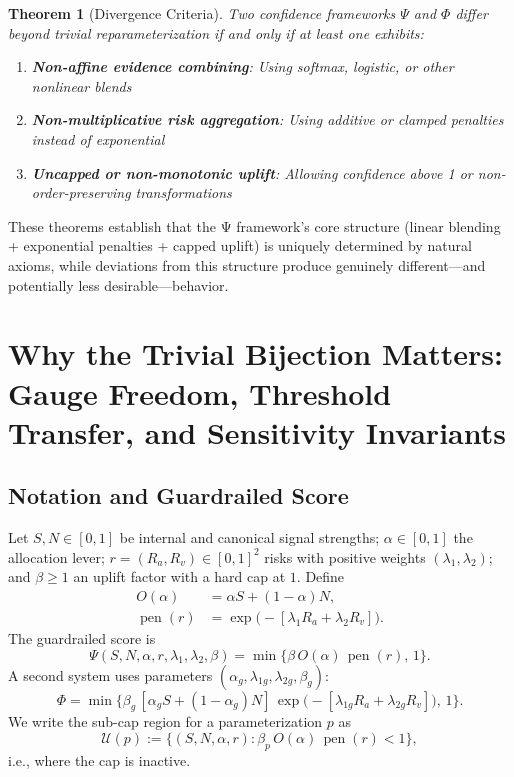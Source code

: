 \documentclass[12pt,a4paper]{article}
\newtheorem{theorem}{Theorem}
\newcommand{\score}{\Psi}
\begin{document}
\begin{theorem}[Divergence Criteria]
\label{thm:divergence}
Two confidence frameworks $\score$ and $\Phi$ differ beyond trivial reparameterization if and only if at least one exhibits:
\begin{enumerate}
\item \textbf{Non-affine evidence combining}: Using softmax, logistic, or other nonlinear blends
\item \textbf{Non-multiplicative risk aggregation}: Using additive or clamped penalties instead of exponential
\item \textbf{Uncapped or non-monotonic uplift}: Allowing confidence above 1 or non-order-preserving transformations
\end{enumerate}
\end{theorem}

These theorems establish that the Ψ framework's core structure (linear blending + exponential penalties + capped uplift) is uniquely determined by natural axioms, while deviations from this structure produce genuinely different—and potentially less desirable—behavior.

\section{Why the Trivial Bijection Matters: Gauge Freedom, Threshold Transfer, and Sensitivity Invariants}

\subsection{Notation and Guardrailed Score}
Let $S,N\in[0,1]$ be internal and canonical signal strengths; $\alpha\in[0,1]$ the allocation lever; $r=(R_a,R_v)\in[0,1]^2$ risks with positive weights $(\lambda_1,\lambda_2)$; and $\beta\ge 1$ an uplift factor with a hard cap at $1$. Define
\begin{align*}
O(\alpha) &= \alpha S + (1-\alpha)N, \\
\operatorname{pen}(r) &= \exp\!\big(-[\lambda_1 R_a + \lambda_2 R_v]\big).
\end{align*}
The guardrailed score is
\[
\Psi(S,N,\alpha,r,\lambda_1,\lambda_2,\beta) = \min\{\beta\,O(\alpha)\,\operatorname{pen}(r),\,1\}.
\]
A second system uses parameters $(\alpha_g,\lambda_{1g},\lambda_{2g},\beta_g)$:
\[
\Phi = \min\Big\{\beta_g\,[\alpha_g S + (1-\alpha_g)N] \, \exp\!\big(-[\lambda_{1g}R_a + \lambda_{2g}R_v]\big),\, 1\Big\}.
\]
We write the sub-cap region for a parameterization $p$ as
\[
\mathcal{U}(p) := \{(S,N,\alpha,r) : \beta_p\,O(\alpha)\,\operatorname{pen}(r) < 1\},
\]
i.e., where the cap is inactive.
\end{document}
